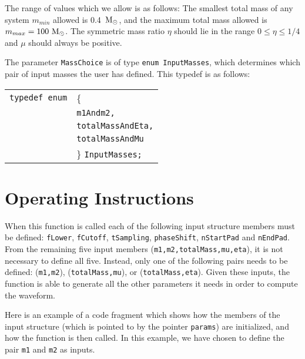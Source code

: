 \documentclass[12pt]{article}
\begin{document}
The range of values which we allow is as follows: The smallest total mass of any system $m_{min}$ allowed is 0.4~$\rm{M_{\odot}}$, and the maximum total mass allowed is $m_{max}=100~\rm{M_{\odot}}$. The symmetric mass ratio $\eta$ should lie in the range $0 \leq \eta \leq 1/4$ and $\mu$ should always be positive.

The parameter \texttt{MassChoice} is of type \texttt{enum InputMasses}, which determines which pair of input masses the user has defined. This typedef is as follows:

\vspace{5mm}

\begin{tabular}{ll}
\texttt{typedef enum} & \{ \\
                      & \texttt{m1Andm2,} \\
                      & \texttt{totalMassAndEta,}  \\
                      & \texttt{totalMassAndMu} \\
                      & \} \texttt{InputMasses;}
\end{tabular}

\vspace{5mm}





\section{Operating Instructions}

When this function is called each of the following input structure members must be defined:
\texttt{fLower}, \texttt{fCutoff}, \texttt{tSampling}, \texttt{phaseShift}, \texttt{nStartPad} and \texttt{nEndPad}. From the remaining five input members (\texttt{m1,m2,totalMass,mu,eta}), it is not necessary to define all five. Instead, only  one of the following pairs needs to be defined: (\texttt{m1,m2}), (\texttt{totalMass,mu}), or (\texttt{totalMass,eta}). Given these inputs, the function is able to generate all the other parameters it needs in order to compute the waveform.

Here is an example of a code fragment which shows how the members of the input structure (which is pointed to by the pointer \texttt{params}) are initialized, and how the function is then called. In this example, we have chosen to define the pair \texttt{m1} and \texttt{m2} as inputs.

\vspace{5mm}
\end{document}
